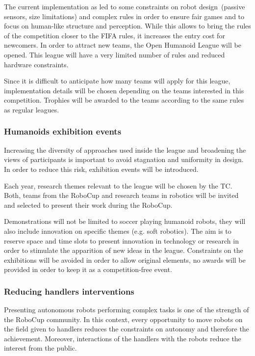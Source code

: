 \documentclass{article}
\begin{document}
The current implementation as led to some constraints on robot design~(passive
sensors, size limitations) and complex rules in order to ensure fair games and
to focus on human-like structure and perception.
While this allows to bring the rules of the competition closer to the FIFA rules,
it increases the entry cost for newcomers.
In order to attract new teams, the Open Humanoid League will be opened.
This league will have a very limited number of rules and reduced hardware constraints.

Since it is difficult to anticipate how many teams will apply for this league,
implementation details will be chosen depending on the teams interested in this
competition.
Trophies will be awarded to the teams according to the same rules as regular leagues.

\subsubsection{Humanoids exhibition events}

Increasing the diversity of approaches used inside the league and broadening the
views of participants is important to avoid stagnation and uniformity in design.
In order to reduce this risk, exhibition events will be introduced.

Each year, research themes relevant to the league will be chosen by the TC.
Both, teams from the RoboCup and research teams in robotics will be
invited and selected to present their work during the RoboCup.

Demonstrations will not be limited to soccer playing humanoid robots, they will
also include innovation on specific themes (e.g. soft robotics).
The aim is to reserve space and time slots to present innovation in technology
or research in order to stimulate the apparition of new ideas in the league.
Constraints on the exhibitions will be avoided in order to allow original
elements, no awards will be provided in order to keep it as a competition-free
event.

\subsubsection{Reducing handlers interventions}
Presenting autonomous robots performing complex tasks is one of the strength of
the RoboCup community.
In this context, every opportunity to move robots on the field given to handlers
reduces the constraints on autonomy and therefore the achievement.
Moreover, interactions of the handlers with the robots reduce the interest from
the public.
\end{document}
